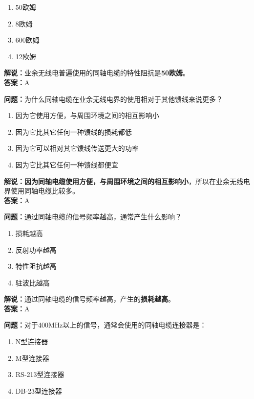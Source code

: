 \begin{enumerate}[label=\Alph*), leftmargin=1cm]
	\item 50欧姆
	\item 8欧姆
	\item 600欧姆
	\item 12欧姆
\end{enumerate}

\textbf{解说：}业余无线电普遍使用的同轴电缆的特性阻抗是\textbf{50欧姆}。\\\textbf{答案：}A%



\textbf{问题：}为什么同轴电缆在业余无线电界的使用相对于其他馈线来说更多？

\begin{enumerate}[label=\Alph*), leftmargin=1cm]
	\item 因为它使用方便，与周围环境之间的相互影响小
	\item 因为它比其它任何一种馈线的损耗都低
	\item 因为它可以相对其它馈线传送更大的功率
	\item 因为它比其它任何一种馈线都便宜
\end{enumerate}

\textbf{解说：}\textbf{因为同轴电缆使用方便，与周围环境之间的相互影响小}，所以在业余无线电界使用同轴电缆比较多。\\\textbf{答案：}A%



\textbf{问题：}通过同轴电缆的信号频率越高，通常产生什么影响？

\begin{enumerate}[label=\Alph*), leftmargin=1cm]
	\item 损耗越高
	\item 反射功率越高
	\item 特性阻抗越高
	\item 驻波比越高
\end{enumerate}

\textbf{解说：}通过同轴电缆的信号频率越高，产生的\textbf{损耗越高}。\\\textbf{答案：}A%



\textbf{问题：}对于400MHz以上的信号，通常会使用的同轴电缆连接器是：

\begin{enumerate}[label=\Alph*), leftmargin=1cm]
	\item N型连接器
	\item M型连接器
	\item RS-213型连接器
	\item DB-23型连接器
\end{enumerate}

